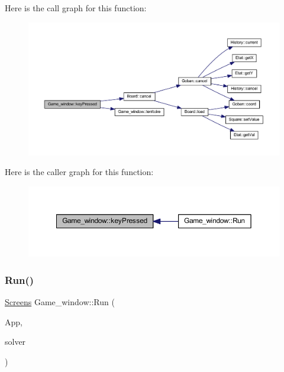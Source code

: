 Here is the call graph for this function\+:
\nopagebreak
\begin{figure}[H]
\begin{center}
\leavevmode
\includegraphics[width=350pt]{class_game__window_a72304de2044c29f1373037bd818f674f_cgraph}
\end{center}
\end{figure}
Here is the caller graph for this function\+:
\nopagebreak
\begin{figure}[H]
\begin{center}
\leavevmode
\includegraphics[width=350pt]{class_game__window_a72304de2044c29f1373037bd818f674f_icgraph}
\end{center}
\end{figure}
\mbox{\label{class_game__window_a555769f4e8511e45d6623658dc736be5}} 
\subsubsection{\texorpdfstring{Run()}{Run()}}
{\footnotesize\ttfamily \hyperlink{_globals_8h_a3d5776bab98402b03be09156bacf4f68}{Screens} Game\+\_\+window\+::\+Run (\begin{DoxyParamCaption}\item[{sf\+::\+Render\+Window \&}]{App,  }\item[{\hyperlink{class_go___solver}{Go\+\_\+\+Solver} \&}]{solver }\end{DoxyParamCaption})\hspace{0.3cm}{\ttfamily [virtual]}}



